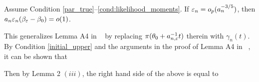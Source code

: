 \begin{lemma}\label{Alemma5} 
Assume Condition \ref{par_true}--\ref{cond:likelihood_moments}. If $\varepsilon_{n}=o_{p}(a_{n}^{-3/5})$, then $a_{n}\varepsilon_{n}(\beta_{\varepsilon}-\beta_{0})=o(1)$.
\end{lemma}
	This generalizes Lemma A4 in ~\cite{Li2017} by replacing $\pi(\theta_{0}+a_{n,\varepsilon}^{-1}t)$
	therein with $\gamma_{n}(t)$. By Condition \ref{initial_upper} and the arguments in the proof
	of Lemma A4 in ~\cite{Li2017}, it can be shown that 
	
	Then by Lemma 2 $(iii)$, the right hand side of the above is equal
	to 
	
